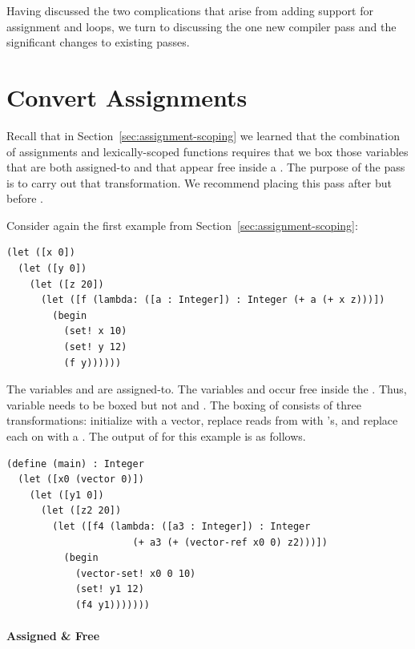 \documentclass[11pt]{book}
\begin{document}
Having discussed the two complications that arise from adding support
for assignment and loops, we turn to discussing the one new compiler
pass and the significant changes to existing passes.

\section{Convert Assignments}
\label{sec:convert-assignments}

Recall that in Section~\ref{sec:assignment-scoping} we learned that
the combination of assignments and lexically-scoped functions requires
that we box those variables that are both assigned-to and that appear
free inside a . The purpose of the
 pass is to carry out that transformation.
We recommend placing this pass after  but before
.

Consider again the first example from
Section~\ref{sec:assignment-scoping}:
\begin{lstlisting}
(let ([x 0])
  (let ([y 0])
    (let ([z 20])
      (let ([f (lambda: ([a : Integer]) : Integer (+ a (+ x z)))])
        (begin
          (set! x 10)
          (set! y 12)
          (f y))))))
\end{lstlisting}
The variables  and  are assigned-to.  The variables
 and  occur free inside the . Thus,
variable  needs to be boxed but not  and .
The boxing of  consists of three transformations: initialize
 with a vector, replace reads from  with
's, and replace each  on  with a
. The output of  for this
example is as follows.
\begin{lstlisting}
(define (main) : Integer
  (let ([x0 (vector 0)])
    (let ([y1 0])
      (let ([z2 20])
        (let ([f4 (lambda: ([a3 : Integer]) : Integer
                      (+ a3 (+ (vector-ref x0 0) z2)))])
          (begin 
            (vector-set! x0 0 10)
            (set! y1 12)
            (f4 y1)))))))
\end{lstlisting}

\paragraph{Assigned \& Free}
\end{document}
